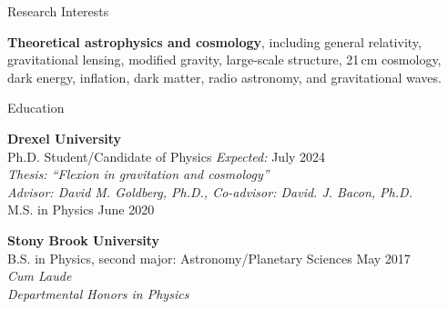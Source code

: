 \documentclass{resume} %
\begin{document}


\begin{rSection}{Research Interests}

\textbf{Theoretical astrophysics and cosmology}, including general relativity, gravitational lensing, modified gravity, large-scale structure, 21\,cm cosmology, dark energy, inflation, dark matter, radio astronomy, and gravitational waves. 

\end{rSection}


\begin{rSection}{Education}

\textbf{Drexel University} \\%
{\color{MidnightBlue} Ph.D.} Student/Candidate of Physics \hfill {\textit{Expected:} July 2024} \\
\textit{Thesis: ``Flexion in gravitation and cosmology''}\\
\textit{Advisor: David M. Goldberg, Ph.D., Co-advisor: David. J. Bacon, Ph.D.}\\
{\color{MidnightBlue} M.S.} in Physics \hfill{June 2020}%

\textbf{Stony Brook University} \\%
{\color{MidnightBlue} B.S.} in Physics, second major: Astronomy/Planetary Sciences \hfill{May 2017}\\%
\textit{Cum Laude}\\
\textit{Departmental Honors in Physics}

\end{rSection}

\end{document}

